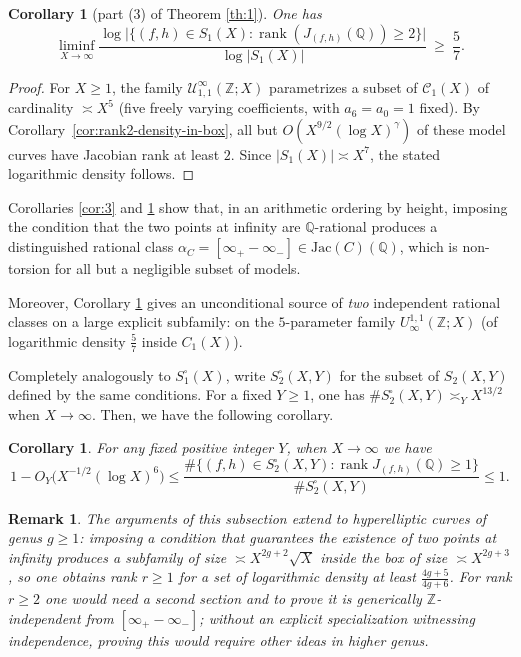 \documentclass{amsart}
\newcommand{\Q}{{\mathbb Q}}
\newcommand{\Z}{{\mathbb Z}}
\newcommand{\cC}{\mathcal{C}}
\newcommand{\cU}{\mathcal{U}}
\newcommand{\Jac}{\mathrm{Jac}}
\DeclareMathOperator{\rank}{\mathrm{rank}}
\newtheorem{remark}[proposition]{Remark}
\newtheorem{corollary}[proposition]{Corollary}
\begin{document}
\begin{corollary}[part (3) of Theorem \ref{th:1}]\label{cor:rank2-logdensity}
One has
\[
\liminf_{X\to\infty}
\frac{\log\bigl|\{(f,h)\in S_1(X): \rank\left(J_{(f,h)}(\Q) \right)\ge 2\}\bigr|}
{\log|S_1(X)|}
\ \ge\ \frac{5}{7}.
\]
\end{corollary}

\begin{proof}
For $X\ge 1$, the family $\cU^{\infty}_{1,1}(\Z;X)$ parametrizes a subset of $\cC_1(X)$ of cardinality
$\asymp X^5$ (five freely varying coefficients, with $a_6=a_0=1$ fixed). By
Corollary~\ref{cor:rank2-density-in-box}, all but $O(X^{9/2}(\log X)^{\gamma})$ of these model curves have
Jacobian rank at least $2$. Since $|S_1(X)|\asymp X^7$, the stated logarithmic density follows.
\end{proof}


Corollaries \ref{cor:3} and \ref{cor:rank2-logdensity} show that, in an arithmetic ordering by height, imposing the condition that the
two points at infinity are $\Q$-rational produces a distinguished rational class
$\alpha_C=[\infty_+-\infty_-]\in \Jac(C)(\Q)$, which is non-torsion for all but a
negligible subset of models.

Moreover, Corollary \ref{cor:rank2-logdensity} gives an unconditional source of \emph{two} independent
rational classes on a large explicit subfamily: on the $5$-parameter family
$U_{\infty}^{1,1}(\Z;X)$ (of logarithmic density $\frac 57$ inside $C_1(X)$).


Completely analogously to $S_1^{\square}(X)$, write $S_2^{\square}(X,Y)$ for the subset of $S_2(X,Y)$ defined by the same conditions. For a fixed $Y \geq 1$, one has $\#S_2^{\square}(X,Y)\asymp_Y X^{13/2}$ when $X \to \infty$. Then, we have the following corollary.


\begin{corollary}\label{prop:box-torsion-booker-S2}
For any fixed positive integer $Y$, when $X \to \infty$ we have
\[
1-O_Y\bigl(X^{-1/2}(\log X)^6\bigr)
\le
\frac{\#\{(f,h)\in S_2^\square(X,Y):
\operatorname{rank}J_{(f,h)}(\mathbb Q)\ge 1\}}
{\#S_2^\square(X,Y)}
\le 1.
\]
\end{corollary}

\begin{remark}\label{rem:higher-genus}
The arguments of this subsection extend to hyperelliptic curves of genus $g\ge 1$:
imposing a condition that guarantees the existence of two points at infinity produces a subfamily
of size $\asymp X^{2g+2}\sqrt{X}$ inside the box of size $\asymp X^{2g+3}$, so one
obtains rank $r\ge 1$ for a set of logarithmic density at least
$\frac{4g+5}{4g+6}$. For rank $r\ge 2$ one would need a second section and to prove
it is generically $\Z$-independent from $[\infty_+-\infty_-]$; without an explicit
specialization witnessing independence, proving this would require other ideas in higher genus.
\end{remark}
\end{document}
